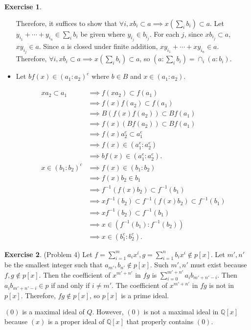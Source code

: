 \documentclass[12pt, psamsfonts]{amsart}
\theoremstyle{definition}
\newtheorem*{exer}{Exercise}
\theoremstyle{remark}
\numberwithin{equation}{section}
\begin{document}
\begin{exer}{3}
\begin{itemize}
      Therefore, it suffices to show that $\forall i, xb_i \subset a \implies x(\sum_i b_i) \subset a$.
      Let $y_{i_1} + \cdots + y_{i_n} \in \sum_i b_i$ be given where $y_{i_j} \in b_{i_j}$.
      For each $j$, since $xb_{i_j} \subset a$, $xy_{i_j} \in a$.
      Since $a$ is closed under finite addition, $xy_{i_1} + \cdots + xy_{i_n} \in a$.
      Therefore, $\forall i, xb_i \subset a \implies x(\sum_i b_i) \subset a$, so $(a:\sum_i b_i) = \cap_i(a:b_i)$.
    \item
      Let $bf(x) \in (a_1:a_2)^e$ where $b \in B$ and $x \in (a_1:a_2)$.

      \begin{align*}
        xa_2 \subset a_1
          &\implies f(xa_2) \subset f(a_1) \\
          &\implies f(x)f(a_2) \subset f(a_1) \\
          &\implies B(f(x)f(a_2)) \subset Bf(a_1) \\
          &\implies f(x)(Bf(a_2)) \subset Bf(a_1) \\
          &\implies f(x)a_2^e \subset a_1^e \\
          &\implies f(x) \in (a_1^e:a_2^e) \\
          &\implies bf(x) \in (a_1^e:a_2^e). \\
        x \in (b_1:b_2)^c
          &\implies f(x) \in (b_1:b_2) \\
          &\implies f(x)b_2 \in b_1 \\
          &\implies f^{-1}(f(x)b_2) \subset f^{-1}(b_1) \\
          &\implies xf^{-1}(b_2) \subset f^{-1}(f(x)b_2) \subset f^{-1}(b_1) \\
          &\implies xf^{-1}(b_2) \subset f^{-1}(b_1) \\
          &\implies x \in (f^{-1}(b_1):f^{-1}(b_2)) \\
          &\implies x \in (b_1^c:b_2^c).
      \end{align*}
  \end{itemize}

\end{exer}

\begin{exer}{(Problem 4)}
  Let $f = \sum_{i=1}^{m} a_ix^i, g = \sum_{i=1}^{n} b_ix^i \notin p[x]$.
  Let $m', n'$ be the smallest integer such that $a_{m'}, b_{n'} \notin p[x]$.
  Such $m', n'$ must exist because $f, g \notin p[x]$.
  Then the coefficient of $x^{m' + n'}$ in $fg$ is $\sum_{i=0}^{m' + n'} a_ib_{m' + n' - i}$.
  Then $a_ib_{m' + n' - i} \in p$ if and only if $i \ne m'$.
  The coefficient of $x^{m' + n'}$ in $fg$ is not in $p[x]$.
  Therefore, $fg \notin p[x]$, so $p[x]$ is a prime ideal.

  $(0)$ is a maximal ideal of $Q$.
  However, $(0)$ is not a maximal ideal in $\mathbb{Q}[x]$ because $(x)$ is a proper ideal of $\mathbb{Q}[x]$ that properly contains $(0)$.
\end{exer}
\end{document}
